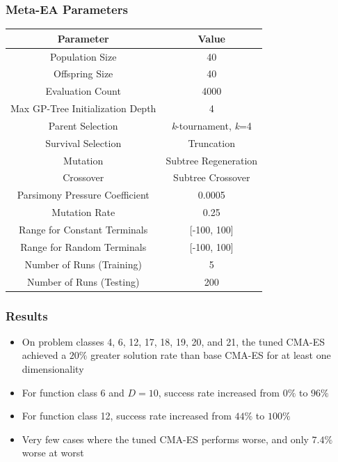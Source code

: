\documentclass{beamer}
\begin{document}
	
	\begin{frame}
		\frametitle{Meta-EA Parameters}
		\begin{table}
			\small
			\begin{tabular}{ c | c | }
			
				Parameter& Value\\
				\hline
				Population Size & 40 \\
				\hline
				Offspring Size & 40\\
				\hline
				Evaluation Count & 4000\\
				\hline
				Max GP-Tree Initialization Depth & 4\\
				\hline
				Parent Selection & \textit{k}-tournament, \textit{k}=4 \\
				\hline
				Survival Selection & Truncation\\
				\hline
				Mutation & Subtree Regeneration\\
				\hline
				Crossover & Subtree Crossover\\
				\hline
				Parsimony Pressure Coefficient & 0.0005\\
				\hline
				Mutation Rate & 0.25\\
				\hline
				Range for Constant Terminals & [-100, 100]\\
				\hline
				Range for Random Terminals & [-100, 100]\\
				\hline
				Number of Runs (Training) & 5 \\
				\hline
				Number of Runs (Testing) & 200\\	
			\end{tabular}
		\end{table}
	\end{frame}
	
	\begin{frame}
		\frametitle{Results}
			\begin{itemize}
			\item<1-|alert@1> On problem classes 4, 6, 12, 17, 18, 19, 20, and 21, the tuned CMA-ES achieved a $20\%$ greater solution rate than base CMA-ES for at least one dimensionality 
			\item<2-|alert@2> For function class 6 and $D=10$, success rate increased from $0\%$ to $96\%$
			\item<3-|alert@3> For function class 12, success rate increased from $44\%$ to $100\%$ 
			\item<4-|alert@4> Very few cases where the tuned CMA-ES performs worse, and only $7.4\%$ worse at worst			
			\end{itemize}
	\end{frame}
	
\end{document}
